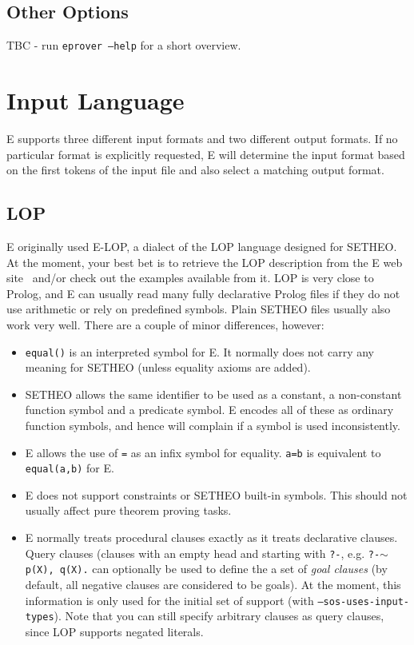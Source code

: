 \documentclass{report}
\begin{document}
\section{Other Options}
\label{sec:options:others}

TBC - run \texttt{eprover --help} for a short overview.


\chapter{Input Language}
\label{sec:language}

E supports three different input formats and two different output
formats. If no particular format is explicitly requested, E will
determine the input format based on the first tokens of the input file
and also select a  matching output format.

\section{LOP}

E originally used E-LOP, a dialect of the LOP language
designed for SETHEO. At the moment, your best bet is to
retrieve the LOP description from the E web site~\cite{E:WWW-22}
and/or check out the examples available from it.  LOP is very close to
Prolog, and E can usually read many fully declarative Prolog files if
they do not use arithmetic or rely on predefined symbols. Plain SETHEO
files usually also work very well.  There are a couple of minor
differences, however:

\begin{itemize}
\item \texttt{equal()} is an interpreted symbol for E. It normally
  does not carry any meaning for SETHEO (unless equality axioms are
  added).
\item SETHEO allows the same identifier to be used as a constant, a
  non-constant function symbol and a predicate symbol. E encodes all
  of these as ordinary function symbols, and hence will complain if a
  symbol is used inconsistently.
\item E allows the use of \texttt{=} as an infix symbol for
  equality. \texttt{a=b} is equivalent to \texttt{equal(a,b)} for E.
\item E does not support constraints or SETHEO built-in
  symbols. This should not usually affect pure theorem proving tasks.
\item E normally treats procedural clauses exactly as it treats
  declarative clauses. Query clauses (clauses with an empty head and
  starting with \texttt{?-}, e.g. \texttt{?-$\sim$p(X), q(X).} can
  optionally be used to define the a set of \emph{goal clauses} (by
  default, all negative clauses are considered to be goals). At the
  moment, this information is only used for the initial set of support
  (with \texttt{--sos-uses-input-types}). Note that you can still
  specify arbitrary clauses as query clauses, since LOP supports
  negated literals.
\end{itemize}
\end{document}
